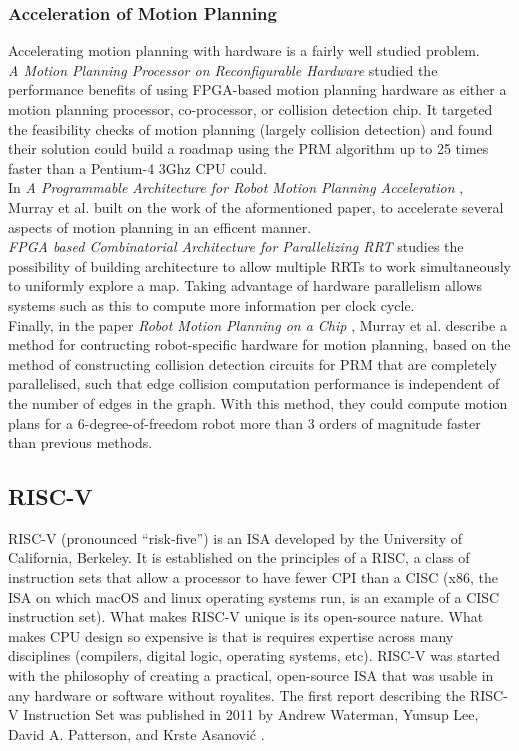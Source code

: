     \subsubsection*{Acceleration of Motion Planning}
        Accelerating motion planning with hardware is a fairly well studied problem. \\
        \textit{A Motion Planning Processor on Reconfigurable Hardware} \cite{Atay2006} studied the performance benefits of using \ac{FPGA}-based motion planning hardware as either a motion planning processor, co-processor, or collision detection chip. It targeted the feasibility checks of motion planning (largely collision detection) and found their solution could build a roadmap using the \ac{PRM} algorithm up to 25 times faster than a Pentium-4 3Ghz CPU could. \\
        In \textit{A Programmable Architecture for Robot Motion Planning Acceleration} \cite{Murray}, Murray et al. built on the work of the aformentioned paper, to accelerate several aspects of motion planning in an efficent manner. \\
        \textit{FPGA based Combinatorial Architecture for Parallelizing RRT} \cite{Malik2015} studies the possibility of building architecture to allow multiple \ac{RRT}s to work simultaneously to uniformly explore a map. Taking advantage of hardware parallelism allows systems such as this to compute more information per clock cycle. \\
        Finally, in the paper \textit{Robot Motion Planning on a Chip} \cite{Murrayb}, Murray et al. describe a method for contructing robot-specific hardware for motion planning, based on the method of constructing collision detection circuits for \ac{PRM} that are completely parallelised, such that edge collision computation performance is independent of the number of edges in the graph. With this method, they could compute motion plans for a 6-degree-of-freedom robot more than 3 orders of magnitude faster than previous methods.

\subsection{RISC-V}
    RISC-V (pronounced ``risk-five'') is an \ac{ISA} developed by the University of California, Berkeley. It is established on the principles of a \ac{RISC}, a class of instruction sets that allow a processor to have fewer \ac{CPI} than a \ac{CISC} (x86, the \ac{ISA} on which macOS and linux operating systems run, is an example of a \ac{CISC} instruction set). What makes RISC-V unique is its open-source nature. What makes \ac{CPU} design so expensive is that is requires expertise across many disciplines (compilers, digital logic, operating systems, etc). RISC-V was started with the philosophy of creating a practical, open-source \ac{ISA} that was usable in any hardware or software without royalites. The first report describing the RISC-V Instruction Set was published in 2011 by Andrew Waterman, Yunsup Lee, David A. Patterson, and Krste Asanović \cite{Isa2012}.

